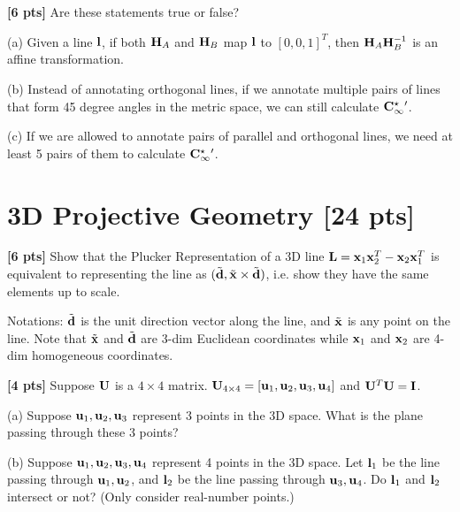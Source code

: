 \documentclass[11pt,addpoints,answers]{exam}
\numberwithin{equation}{section} %
\numberwithin{figure}{section} %
\numberwithin{table}{section} %
\begin{document}
\begin{questions}
\question \textbf{[6 pts]} Are these statements true or false?


(a) Given a line $\mathbf{l}$, if both $\mathbf{H}_A$ and $\mathbf{H}_B$ map $\mathbf{l}$ to $[0,0,1]^T$, then $\mathbf{H}_A\mathbf{H}_B^{-1}$ is an affine transformation. 

(b) Instead of annotating orthogonal lines, if we annotate multiple pairs of lines that form 45 degree angles in the metric space, we can still calculate $\mathbf{C}_\infty^{\star}{}'$.

(c) If we are allowed to annotate pairs of parallel and orthogonal lines, we need at least 5 pairs of them to calculate $\mathbf{C}_\infty^{\star}{}'$.

\begin{tcolorbox}[fit,height=5cm, width=\textwidth, blank, borderline={0.5pt}{-2pt},halign=left, valign=center, nobeforeafter]



\end{tcolorbox}


\section{3D Projective Geometry [24 pts]}

\question \textbf{[6 pts]} Show that the Plucker Representation of a 3D line $\mathbf{L} = \mathbf{x}_1\mathbf{x}_2^T - \mathbf{x}_2\mathbf{x}_1^T$ is equivalent to representing the line as $(\tilde {\mathbf{d}}, \tilde {\mathbf{x}} \times \tilde {\mathbf{d}})$, i.e. show they have the same elements up to scale.

Notations: $\tilde{\mathbf{d}}$ is the unit direction vector along the line, and $\tilde {\mathbf{x}}$ is any point on the line. Note that $\tilde{\mathbf{x}}$ and $\tilde{\mathbf{d}}$ are 3-dim Euclidean coordinates while $\mathbf{x}_1$ and $\mathbf{x}_2$ are 4-dim homogeneous coordinates.

\begin{tcolorbox}[fit,height=10cm, width=\textwidth, blank, borderline={0.5pt}{-2pt},halign=left, valign=center, nobeforeafter]


\end{tcolorbox}

\question \textbf{[4 pts]} Suppose $\mathbf{U}$ is a $4\times 4$ matrix. $\mathbf{U}_{4 \times 4} = [\mathbf{u}_1, \mathbf{u}_2, \mathbf{u}_3, \mathbf{u}_4]$ and $\mathbf{U}^T\mathbf{U} = \mathbf{I}$.

(a) Suppose $\mathbf{u}_1, \mathbf{u}_2, \mathbf{u}_3$ represent 3 points in the 3D space. What is the plane passing through these 3 points?

(b) Suppose $\mathbf{u}_1, \mathbf{u}_2, \mathbf{u}_3, \mathbf{u}_4$ represent 4 points in the 3D space. Let $\mathbf{l}_1$ be the line passing through $\mathbf{u}_1, \mathbf{u}_2$, and $\mathbf{l}_2$ be the line passing through $\mathbf{u}_3, \mathbf{u}_4$. Do $\mathbf{l}_1$ and $\mathbf{l}_2$ intersect or not? (Only consider real-number points.)


\end{questions}
\end{document}
